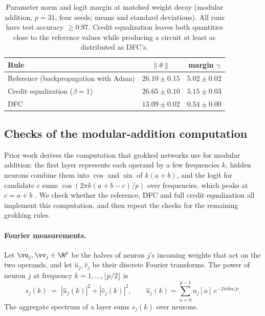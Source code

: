 \documentclass{article} %
\begin{document}
\begin{table}[!ht]
\caption{Parameter norm and logit margin at matched weight decay (modular addition, $p=31$, four seeds; means and standard deviations). All runs have test accuracy $\geq 0.97$. Credit equalization leaves both quantities close to the reference values while producing a circuit at least as distributed as DFC's.}
\label{tab:norms}
\begin{center}
\begin{tabular}{lcc}
\toprule
Rule & $\|\theta\|$ & margin $\gamma$ \\
\midrule
Reference (backpropagation with Adam) & $26.10 \pm 0.15$ & $5.02 \pm 0.02$ \\
Credit equalization ($\beta{=}1$) & $26.65 \pm 0.10$ & $5.15 \pm 0.03$ \\
DFC                & $13.09 \pm 0.02$ & $0.54 \pm 0.00$ \\
\bottomrule
\end{tabular}
\end{center}
\end{table}

\subsection{Checks of the modular-addition computation}
\label{app:algo}
Prior work derives the computation that grokked networks use for modular addition: the first layer represents each operand by a few frequencies $k$, hidden neurons combine them into $\cos$ and $\sin$ of $k(a+b)$, and the logit for candidate $c$ sums $\cos(2\pi k(a+b-c)/p)$ over frequencies, which peaks at $c = a + b$ \citep{nanda2023progress,gromov2023grokking,chughtai2023toy,morwani2024feature}. We check whether the reference, DFC and full credit equalization all implement this computation, and then repeat the checks for the remaining grokking rules.

\paragraph{Fourier measurements.} Let $\vu_j, \vv_j \in \R^p$ be the halves of neuron $j$'s incoming weights that act on the two operands, and let $\hat{u}_j, \hat{v}_j$ be their discrete Fourier transforms. The power of neuron $j$ at frequency $k = 1, \dots, \lfloor p/2 \rfloor$ is
\begin{equation}
s_j(k) \;=\; |\hat{u}_j(k)|^2 + |\hat{v}_j(k)|^2,
\qquad
\hat{u}_j(k) = \textstyle\sum_{a=0}^{p-1} u_j[a]\, e^{-2\pi i k a / p}.
\label{eq:spectrum}
\end{equation}
The aggregate spectrum of a layer sums $s_j(k)$ over neurons.
\end{document}
